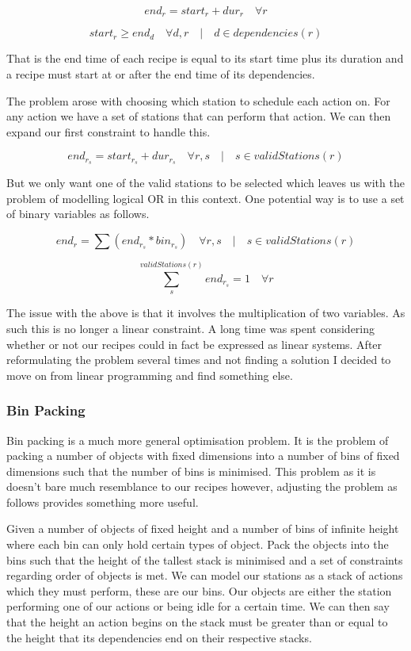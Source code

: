 \documentclass[11pt]{article}
\begin{document}
\[ end_r = start_r + dur_r \quad \forall r \]

\[ start_r \geq end_d \quad \forall d,r \quad | \quad d \in dependencies(r) \]

That is the end time of each recipe is equal to its start time plus its duration and a recipe
must start at or after the end time of its dependencies.

The problem arose with choosing which station to schedule each action on. For any action we
have a set of stations that can perform that action. We can then expand our first constraint
to handle this.

\[ end_{r_s} = start_{r_s} + dur_{r_s} \quad \forall r,s \quad | \quad s \in validStations(r) \]

But we only want one of the valid stations to be selected which leaves us with the problem
of modelling logical OR in this context. One potential way is to use a set of binary variables
as follows.

\[ end_r = \sum (end_{r_s} * bin_{r_s}) \quad \forall r,s \quad | \quad s \in validStations(r) \]

\[ \sum_{s}^{validStations(r)} end_{r_s} = 1 \quad \forall r \]

The issue with the above is that it involves the multiplication of two variables. As such this
is no longer a linear constraint. A long time was spent considering whether or not our recipes
could in fact be expressed as linear systems. After reformulating the problem several times
and not finding a solution I decided to move on from linear programming and find something else.

\subsubsection{Bin Packing}

Bin packing is a much more general optimisation problem. It is the problem of packing a number
of objects with fixed dimensions into a number of bins of fixed dimensions such that the number
of bins is minimised. This problem as it is doesn't bare much resemblance to our recipes however,
adjusting the problem as follows provides something more useful.

\medbreak

Given a number of objects of fixed height and a number of bins of infinite height where each
bin can only hold certain types of object. Pack the objects into the bins such that the
height of the tallest stack is minimised and a set of constraints regarding order of
objects is met. We can model our stations as a stack of actions which they must perform,
these are our bins. Our objects are either the station performing one of our actions
or being idle for a certain time. We can then say that the height an action begins on
the stack must be greater than or equal to the height that its dependencies end on their
respective stacks.
\end{document}
